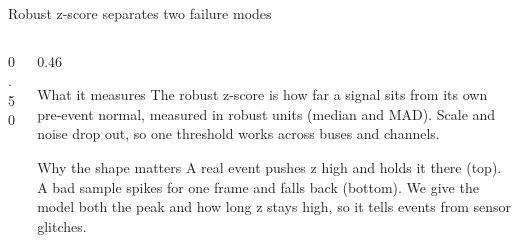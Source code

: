 \documentclass[aspectratio=169,10pt,t]{beamer}
\begin{document}

\fi
\begin{frame}{Robust z-score separates two failure modes}
\small
\begin{columns}[T,totalwidth=\textwidth]
\begin{column}{0.50\textwidth}
\centering
{}\\[1mm]
\end{column}
\begin{column}{0.46\textwidth}
\begin{block}{What it measures}
The robust z-score is how far a signal sits from its own pre-event normal, measured in robust units (median and MAD). Scale and noise drop out, so one threshold works across buses and channels.
\end{block}
\begin{block}{Why the shape matters}
A real event pushes z high and holds it there (top). A bad sample spikes for one frame and falls back (bottom). We give the model both the peak and how long z stays high, so it tells events from sensor glitches.
\end{block}
\end{column}
\end{columns}
\end{frame}
\end{document}
